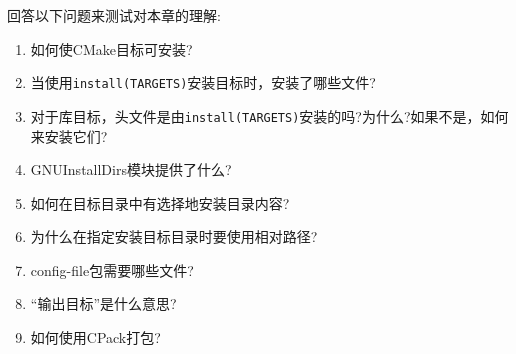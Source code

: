 回答以下问题来测试对本章的理解:

\begin{enumerate}
\item 
如何使CMake目标可安装?

\item 
当使用\texttt{install(TARGETS)}安装目标时，安装了哪些文件?

\item 
对于库目标，头文件是由\texttt{install(TARGETS)}安装的吗?为什么?如果不是，如何来安装它们?

\item 
GNUInstallDirs模块提供了什么?

\item 
如何在目标目录中有选择地安装目录内容?

\item 
为什么在指定安装目标目录时要使用相对路径?

\item 
config-file包需要哪些文件?

\item 
“输出目标”是什么意思?

\item 
如何使用CPack打包?
\end{enumerate}